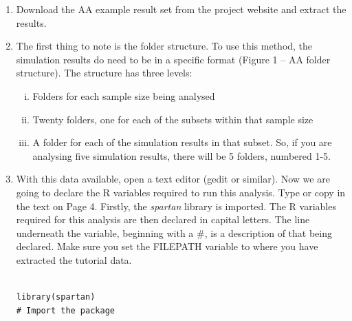 \documentclass[a4paper,11pt]{article}
\begin{document}
\begin{enumerate}
\item Download the AA example result set from the project website and extract the results.
\item The first thing to note is the folder structure.  To use this method, the simulation results do need to be in a specific format (Figure 1 – AA folder structure).  The structure has three levels:
\begin{enumerate}[(i)]
\item Folders for each sample size being analysed
\item Twenty folders, one for each of the subsets within that sample size
\item A folder for each of the simulation results in that subset.  So, if you are analysing five simulation results, there will be 5 folders, numbered 1-5. 
\end{enumerate}
\item With this data available, open a text editor (gedit or similar).  Now we are going to declare the R variables required to run this analysis.  Type or copy in the text on Page 4.  Firstly, the \textit{spartan} library is imported. The R variables required for this analysis are then declared in capital letters. The line underneath the variable, beginning with a \#, is a description of that being declared. Make sure you set the FILEPATH variable to where you have extracted the tutorial data.


\begin{verbatim}

library(spartan)
# Import the package


\end{verbatim}
\end{enumerate}
\end{document}
